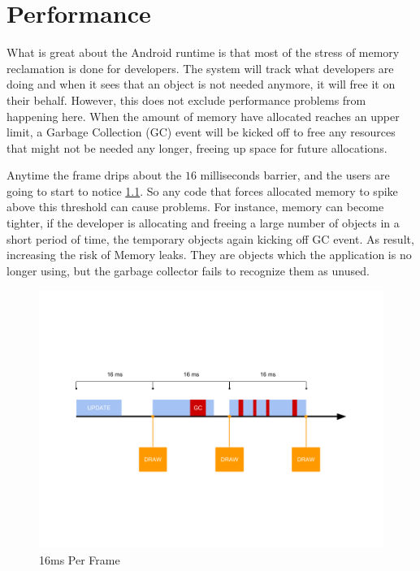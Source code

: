 \label{chapter-performance}
\chapter{Performance}

What is great about the Android runtime is that most of the stress of memory reclamation is done for developers. The system will track what developers are doing and when it sees that an object is not needed anymore, it will free it on their behalf. However, this does not exclude performance problems from happening here. When the amount of memory have allocated reaches an upper limit, a Garbage Collection (GC) event will be kicked off to free any resources that might not be needed any longer, freeing up space for future allocations. 

Anytime the frame drips about the $16$ milliseconds barrier, and the users are going to start to notice \ref{fig:16ms-per-frame}. So any code that forces allocated memory to spike above this threshold can cause problems. For instance, memory can become tighter, if the developer is allocating and freeing a large number of objects in a short period of time, the temporary objects again kicking off GC event. As result, increasing the risk of Memory leaks. They are objects which the application is no longer using, but the garbage collector fails to recognize them as unused.

\begin{figure}[H]
\caption{16ms Per Frame}
\label{fig:16ms-per-frame}
\centering
\includegraphics[width=\textwidth, keepaspectratio]{Figures/16ms-per-frame.png}
\decoRule
\end{figure}

